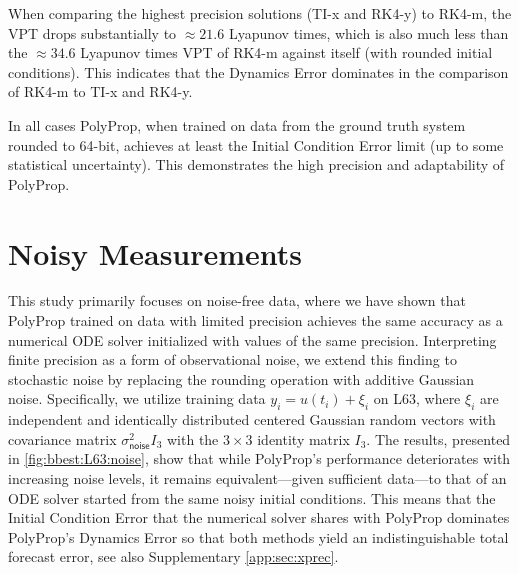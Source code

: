 \documentclass{article}
\newcommand*{\ms}[1]{\mathsf{#1}}
\begin{document}
When comparing the highest precision solutions (TI-x and RK4-y) to RK4-m, the VPT drops substantially to $\approx 21.6$ Lyapunov times, which is also much less than the $\approx 34.6$ Lyapunov times VPT of RK4-m against itself (with rounded initial conditions). This indicates that the Dynamics Error dominates in the comparison of RK4-m to TI-x and RK4-y.

In all cases PolyProp, when trained on data from the ground truth system rounded to 64-bit, achieves at least the Initial Condition Error limit (up to some statistical uncertainty). This demonstrates the high precision and adaptability of PolyProp.
\clearpage
\section{Noisy Measurements}\label{app:sec:noise}
%

This study primarily focuses on noise-free data, where we have shown that PolyProp trained on data with limited precision achieves the same accuracy as a numerical ODE solver initialized with values of the same precision. Interpreting finite precision as a form of observational noise, we extend this finding to stochastic noise by replacing the rounding operation with additive Gaussian noise. Specifically, we utilize training data $y_i = u(t_i) + \xi_i$ on L63, where $\xi_i$ are independent and identically distributed centered Gaussian random vectors with covariance matrix $\sigma_{\ms{noise}}^2 I_3$ with the $3\times 3$ identity matrix $I_3$. The results, presented in \cref{fig:bbest:L63:noise}, show that while PolyProp's performance deteriorates with increasing noise levels, it remains equivalent---given sufficient data---to that of an ODE solver started from the same noisy initial conditions. This means that the Initial Condition Error that the numerical solver shares with PolyProp dominates PolyProp's Dynamics Error so that both methods yield an indistinguishable total forecast error, see also Supplementary \cref{app:sec:xprec}.
\end{document}
